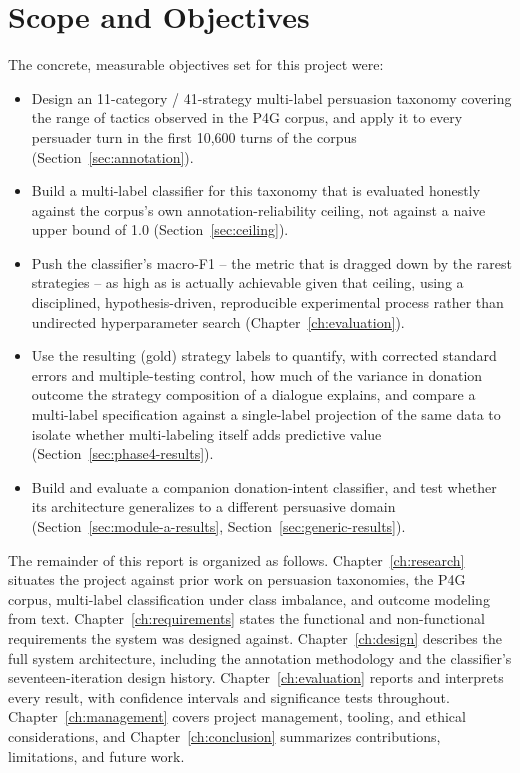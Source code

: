 \section{Scope and Objectives}

\noindent The concrete, measurable objectives set for this project were:

\begin{itemize}
\item Design an 11-category / 41-strategy multi-label persuasion taxonomy
  covering the range of tactics observed in the P4G corpus, and apply it to
  every persuader turn in the first 10{,}600 turns of the corpus
  (Section~\ref{sec:annotation}).
\item Build a multi-label classifier for this taxonomy that is evaluated
  honestly against the corpus's own annotation-reliability ceiling, not
  against a naive upper bound of 1.0 (Section~\ref{sec:ceiling}).
\item Push the classifier's macro-F1 -- the metric that is dragged down by
  the rarest strategies -- as high as is actually achievable given that
  ceiling, using a disciplined, hypothesis-driven, reproducible experimental
  process rather than undirected hyperparameter search
  (Chapter~\ref{ch:evaluation}).
\item Use the resulting (gold) strategy labels to quantify, with corrected
  standard errors and multiple-testing control, how much of the variance in
  donation outcome the strategy composition of a dialogue explains, and
  compare a multi-label specification against a single-label projection of
  the same data to isolate whether multi-labeling itself adds predictive
  value (Section~\ref{sec:phase4-results}).
\item Build and evaluate a companion donation-intent classifier, and test
  whether its architecture generalizes to a different persuasive domain
  (Section~\ref{sec:module-a-results}, Section~\ref{sec:generic-results}).
\end{itemize}

The remainder of this report is organized as follows.
Chapter~\ref{ch:research} situates the project against prior work on
persuasion taxonomies, the P4G corpus, multi-label classification under class
imbalance, and outcome modeling from text. Chapter~\ref{ch:requirements}
states the functional and non-functional requirements the system was designed
against. Chapter~\ref{ch:design} describes the full system architecture,
including the annotation methodology and the classifier's seventeen-iteration
design history. Chapter~\ref{ch:evaluation} reports and interprets every
result, with confidence intervals and significance tests throughout.
Chapter~\ref{ch:management} covers project management, tooling, and ethical
considerations, and Chapter~\ref{ch:conclusion} summarizes contributions,
limitations, and future work.
